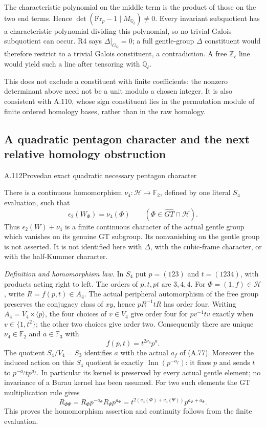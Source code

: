 The characteristic polynomial on the middle term is the
product of those on the two end terms. Hence
$\det(\mathrm{Fr}_p-1\mid M_{\mathbb Q_\ell})\ne0$.
Every invariant subquotient has a characteristic polynomial
dividing this polynomial, so no trivial Galois subquotient
can occur. R4 says $\Delta|_{G_{\mathbb Q}}=0$; a full
gentle-group $\Delta$ constituent would therefore restrict
to a trivial Galois constituent, a contradiction. A free
$\mathbb Z_\ell$ line would yield such a line after tensoring
with $\mathbb Q_\ell$.

This does not exclude a constituent with finite coefficients:
the nonzero determinant above need not be a unit modulo a
chosen integer. It is also consistent with A.110, whose
sign constituent lies in the permutation module of finite
ordered homology bases, rather than in the raw homology.

\subsection{A quadratic pentagon character and the next relative homology obstruction}


\begin{statement}{A.112}{Proved}{an exact quadratic necessary pentagon character}
\end{statement}
There is a continuous homomorphism
$\nu_4:\mathcal H\to\mathbb F_2$, defined by one literal
$S_4$ evaluation, such that
\[
 \boxed{\quad \epsilon_2(W_\Phi)=\nu_4(\Phi)
                 \qquad(\Phi\in\widehat{GT}\cap\mathcal H).\quad}
 \tag{FP.37.1}
\]
Thus $\epsilon_2(W)+\nu_4$ is a finite continuous character
of the actual gentle group which vanishes on its genuine GT
subgroup. Its nonvanishing on the gentle group is not asserted.
It is not identified here with $\Delta$, with the cubic-frame
character, or with the half-Kummer character.

\emph{Definition and homomorphism law.}
In $S_4$ put $p=(123)$ and $t=(1234)$, with products acting
right to left. The orders of $p,t,pt$ are $3,4,4$.
For $\Phi=(1,f)\in\mathcal H$, write $R=f(p,t)\in A_4$.
The actual peripheral automorphism of the free group preserves
the conjugacy class of $xy$, hence $pR^{-1}tR$ has order four.
Writing $A_4=V_4\rtimes\langle p\rangle$, the four choices
of $v\in V_4$ give order four for $pv^{-1}tv$ exactly when
$v\in\{1,t^2\}$; the other two choices give order two.
Consequently there are unique $\nu_4\in\mathbb F_2$ and
$a\in\mathbb F_3$ with
\[
                 f(p,t)=t^{2\nu_4}p^a.
 \tag{FP.37.2}
\]
The quotient $S_4/V_4=S_3$ identifies $a$ with the actual
$a_f$ of (A.77). Moreover the induced action on this $S_4$
quotient is exactly $\operatorname{Inn}(p^{-a_f})$:
it fixes $p$ and sends $t$ to $p^{-a_f}tp^{a_f}$.
In particular its kernel is preserved by every actual gentle
element; no invariance of a Burau kernel has been assumed.
For two such elements the GT multiplication rule gives
\[
 R_{\Phi\Psi}
   =R_\Phi p^{-a_\Phi}R_\Psi p^{a_\Phi}
   =t^{2(\nu_4(\Phi)+\nu_4(\Psi))}
                  p^{a_\Phi+a_\Psi}.
\]
This proves the homomorphism assertion and continuity follows
from the finite evaluation.

